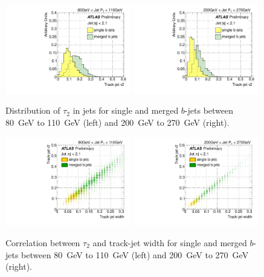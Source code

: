 \begin{figure}[tp]
\centering
\includegraphics[width=0.49\textwidth]{FIGS/VarsSingleMerged/Tau2080.pdf}
\includegraphics[width=0.49\textwidth]{FIGS/VarsSingleMerged/Tau2200.pdf}
\caption{Distribution of $\tau_2$ in jets for single and merged $b$-jets between 80~GeV to 110~GeV (left) and 200~GeV to 270~GeV (right).}
\label{fig:tau2singlemerged}
\end{figure}


\begin{figure}[tp]
\centering
\includegraphics[width=0.49\textwidth]{FIGS/VarsSingleMerged/Tau2trkWidth080.pdf}
\includegraphics[width=0.49\textwidth]{FIGS/VarsSingleMerged/Tau2trkWidth200.pdf}
\caption{Correlation between $\tau _2$ and track-jet width for single and merged $b$-jets between 80~GeV to 110~GeV (left) and 200~GeV to 270~GeV (right).}
\label{fig:tau2trkwidthsinglemerged}
\end{figure}

